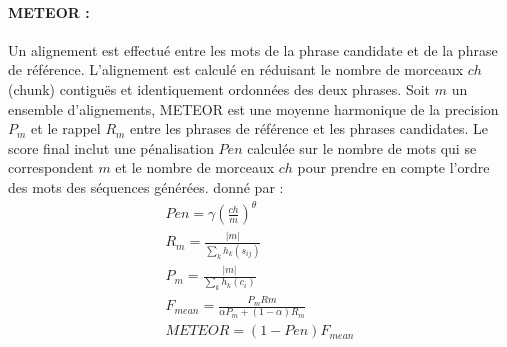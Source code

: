 \paragraph{METEOR \cite{denkowski2014meteor}:} 
Un alignement est effectué entre les mots de la phrase candidate et de la phrase de référence.
L'alignement est calculé en réduisant le nombre de morceaux  $ch$ (chunk)  contiguës et identiquement ordonnées  des deux phrases.
Soit $m$ un ensemble d'alignements, METEOR est une moyenne harmonique de la precision $P_m$ et le rappel $R_m$ entre les phrases de référence et les phrases candidates. Le score final inclut une pénalisation $Pen$ calculée sur le nombre de mots qui se correspondent $m$ et le nombre de morceaux $ch$ pour prendre en compte l'ordre des mots des séquences générées.
donné par :
\begin{eqnarray}
Pen= \gamma \left ( \frac{ch}{m} \right )^{\theta}\\
R_{m}= \frac{|m|}{\sum_{k}h_{k}(s_{ij})}\\
P_{m}= \frac{|m|}{\sum_{k}h_{k}(c_{i})}\\
F_{mean} = \frac{P_{m}R{m}}{\alpha P_{m}+(1-\alpha)R_{m}}\\
METEOR=(1-Pen)F_{mean}
\end{eqnarray}


